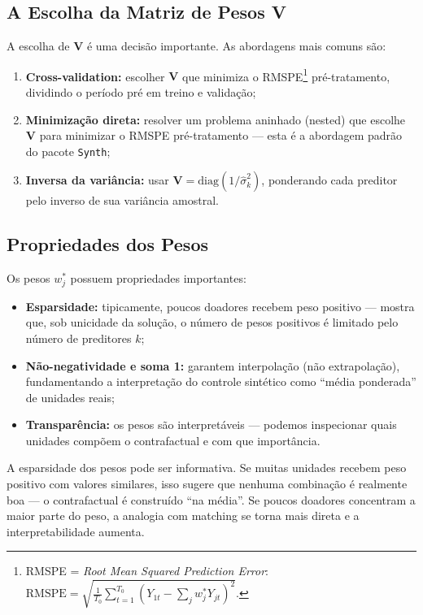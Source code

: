 \documentclass[12pt, a4paper, openany]{book}
\begin{document}
\subsection{A Escolha da Matriz de Pesos V}

A escolha de $\mathbf{V}$ é uma decisão importante. As abordagens mais comuns são:

\begin{enumerate}[leftmargin=1.5cm]
  \item \textbf{Cross-validation:} escolher $\mathbf{V}$ que minimiza o RMSPE\footnote{RMSPE = \textit{Root Mean Squared Prediction Error}: $\text{RMSPE} = \sqrt{\frac{1}{T_0} \sum_{t=1}^{T_0} (Y_{1t} - \sum_j w_j^* Y_{jt})^2}$.} pré-tratamento, dividindo o período pré em treino e validação;
  \item \textbf{Minimização direta:} resolver um problema aninhado (nested) que escolhe $\mathbf{V}$ para minimizar o RMSPE pré-tratamento --- esta é a abordagem padrão do pacote \texttt{Synth};
  \item \textbf{Inversa da variância:} usar $\mathbf{V} = \text{diag}(1/\hat{\sigma}_k^2)$, ponderando cada preditor pelo inverso de sua variância amostral.
\end{enumerate}

\subsection{Propriedades dos Pesos}

Os pesos $w_j^*$ possuem propriedades importantes:
\begin{itemize}[leftmargin=1.5cm]
  \item \textbf{Esparsidade:} tipicamente, poucos doadores recebem peso positivo --- \cite{Abadie2021} mostra que, sob unicidade da solução, o número de pesos positivos é limitado pelo número de preditores $k$;
  \item \textbf{Não-negatividade e soma 1:} garantem interpolação (não extrapolação), fundamentando a interpretação do controle sintético como ``média ponderada'' de unidades reais;
  \item \textbf{Transparência:} os pesos são interpretáveis --- podemos inspecionar quais unidades compõem o contrafactual e com que importância.
\end{itemize}

\begin{notabox}
A esparsidade dos pesos pode ser informativa. Se muitas unidades recebem peso positivo com valores similares, isso sugere que nenhuma combinação é realmente boa --- o contrafactual é construído ``na média''. Se poucos doadores concentram a maior parte do peso, a analogia com matching se torna mais direta e a interpretabilidade aumenta.
\end{notabox}
\end{document}
